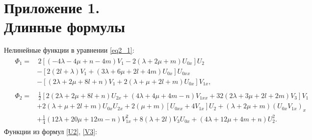 \documentclass[12pt, a4paper]{report}
\begin{document}
\chapter*{Приложение 1. \\Длинные формулы}
\vspace{-5mm}
Нелинейные функции в уравнении \eqref{eq2_1}:
\begin{equation} \nonumber
\begin{split}
&\begin{split}
\Phi_1 =& \, 2\left[(-4\lambda - 4\mu + n - 4m) V_1 - 2(\lambda + 2\mu + m) U_{0x}\right] U_2 \\
&- \left[ 2(2l + \lambda) V_1 + (3\lambda + 6\mu + 2l + 4m) U_{0x} \right] U_{0xx} \\
& - \left[ (2\lambda + 2\mu + 8l + n) V_1 + 2(\lambda + \mu + 2l + m) U_{0x} \right] V_{1x},
\end{split} \\
&\begin{split}
\Phi_2 =& \, \frac12 \left[2 (2\lambda + 2\mu + 8l + n) U_{2x} + (4\lambda + 4\mu + 4m - n) V_{1xx} + 32(2\lambda + 3\mu + 2l + 2m) V_3 \right] V_1 \\
& + 2(\lambda + \mu + 2l + m) U_{0x} U_{2x} + 2(\mu + m)\left[ U_{0xx} + 4 V_{1x} \right] U_2 + (\lambda + 2\mu + m)(U_{0x} V_{1x})_x\\
& + \frac14(12\lambda + 20\mu + 12m - n) V_{1x}^2 + 8(\lambda + 2l) V_3 U_{0x} + (4\lambda + 12\mu + 4m + n) U_2^2.
\end{split}
\end{split}
\end{equation}
Функции из формул \eqref{U2}, \eqref{V3}:
\end{document}
